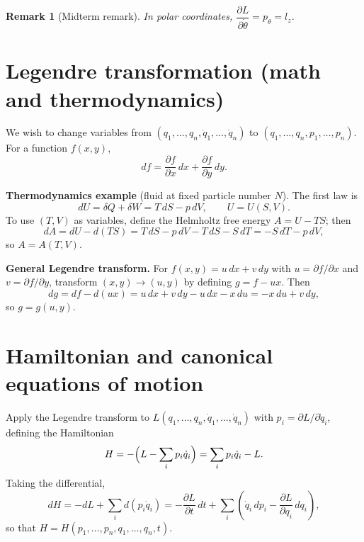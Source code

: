 \documentclass[11pt]{article}
\newtheorem{remark}{Remark}
\begin{document}
\begin{remark}[Midterm remark]
In polar coordinates, $\dfrac{\partial L}{\partial \dot{\theta}} = p_\theta = l_z$.
\end{remark}

\section{Legendre transformation (math and thermodynamics)}

We wish to change variables from $(q_1,\ldots,q_n,\dot{q}_1,\ldots,\dot{q}_n)$ to
$(q_1,\ldots,q_n,p_1,\ldots,p_n)$. For a function $f(x,y)$,
\begin{equation}
  df = \frac{\partial f}{\partial x}\,dx + \frac{\partial f}{\partial y}\,dy.
\end{equation}

\textbf{Thermodynamics example} (fluid at fixed particle number $N$). The first law is
\begin{equation}
  dU = \delta Q + \delta W = T\,dS - p\,dV, \qquad U = U(S,V).
\end{equation}
To use $(T,V)$ as variables, define the Helmholtz free energy $A = U - TS$; then
\begin{equation}
  dA = dU - d(TS) = T\,dS - p\,dV - T\,dS - S\,dT = -S\,dT - p\,dV,
\end{equation}
so $A = A(T,V)$.

\textbf{General Legendre transform.} For $f(x,y) = u\,dx + v\,dy$ with
$u = \partial f/\partial x$ and $v = \partial f/\partial y$, transform $(x,y) \to (u,y)$ by
defining $g = f - ux$. Then
\begin{equation}
  dg = df - d(ux) = u\,dx + v\,dy - u\,dx - x\,du = -x\,du + v\,dy,
\end{equation}
so $g = g(u,y)$.

\section{Hamiltonian and canonical equations of motion}

Apply the Legendre transform to $L(q_1,\ldots,q_n,\dot{q}_1,\ldots,\dot{q}_n)$ with
$p_i = \partial L/\partial \dot{q}_i$, defining the Hamiltonian
\begin{equation}
  H = -\Bigl(L - \sum_i p_i\dot{q}_i\Bigr) = \sum_i p_i\dot{q}_i - L.
\end{equation}
Taking the differential,
\begin{equation}
  dH = -dL + \sum_i d(p_i\dot{q}_i)
     = -\frac{\partial L}{\partial t}\,dt
     + \sum_i\left(\dot{q}_i\,dp_i - \frac{\partial L}{\partial q_i}\,dq_i\right),
\end{equation}
so that $H = H(p_1,\ldots,p_n,q_1,\ldots,q_n,t)$.
\end{document}
